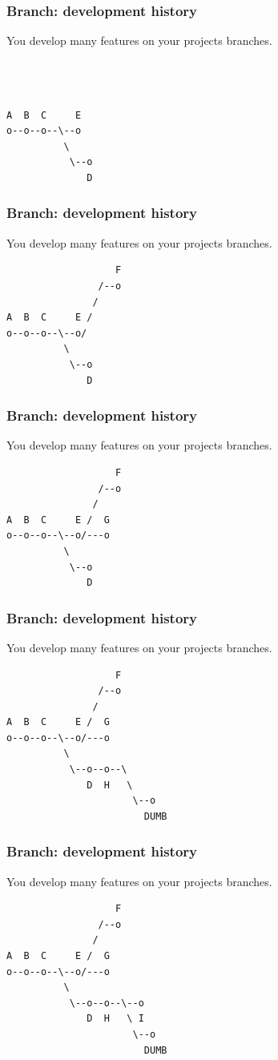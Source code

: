 \documentclass[unknownkeysallowed]{beamer}
\begin{document}
\begin{frame}[fragile]
	\frametitle{Branch: development history}
	You develop many features on your projects branches.
\begin{verbatim}

             
              
A  B  C     E
o--o--o--\--o
          \ 
           \--o
              D  
\end{verbatim}
\end{frame}

\begin{frame}[fragile]
	\frametitle{Branch: development history}
	You develop many features on your projects branches.
\begin{verbatim}
                   F
                /--o
               /
A  B  C     E /
o--o--o--\--o/
          \ 
           \--o
              D  
\end{verbatim}
\end{frame}

\begin{frame}[fragile]
	\frametitle{Branch: development history}
	You develop many features on your projects branches.
\begin{verbatim}
                   F
                /--o
               /
A  B  C     E /  G
o--o--o--\--o/---o
          \ 
           \--o
              D  
\end{verbatim}
\end{frame}

\begin{frame}[fragile]
	\frametitle{Branch: development history}
	You develop many features on your projects branches.
\begin{verbatim}
                   F
                /--o
               /
A  B  C     E /  G
o--o--o--\--o/---o
          \ 
           \--o--o--\
              D  H   \
                      \--o
                        DUMB
\end{verbatim}
\end{frame}

\begin{frame}[fragile]
	\frametitle{Branch: development history}
	You develop many features on your projects branches.
\begin{verbatim}
                   F
                /--o
               /
A  B  C     E /  G
o--o--o--\--o/---o
          \            
           \--o--o--\--o
              D  H   \ I
                      \--o
                        DUMB
\end{verbatim}
\end{frame}
\end{document}
